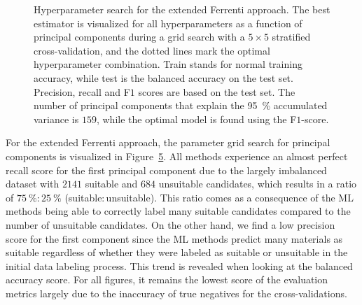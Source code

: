 \documentclass[superscriptaddress,unsortedaddress,
 amsmath,amssymb,
 aps,
]{revtex4-2}
\begin{document}
\begin{figure}[ht!]
  \begin{subfigure}[b]{1.0\textwidth}
    \centering
    
  \end{subfigure}
\par\bigskip
  \begin{subfigure}[b]{0.5\textwidth}
    
    \caption{}
    \label{fig:q2-LOG}
  \end{subfigure}%
  \hfill
  \begin{subfigure}[b]{0.5\textwidth}
    
    \caption{}
    \label{fig:q2-DT}
  \end{subfigure}

  \begin{subfigure}[b]{0.5\textwidth}
    
    \caption{}
    \label{fig:q2-RF}
  \end{subfigure}%
  \hfill
  \begin{subfigure}[b]{0.5\textwidth}
    
    \caption{}
    \label{fig:q2-GB}
  \end{subfigure}
  \caption{Hyperparameter search for the extended Ferrenti approach. The best estimator is visualized for all hyperparameters as a function of principal components during a grid search with a $5\times5$ stratified cross-validation, and the dotted lines mark the optimal hyperparameter combination. Train stands for normal training accuracy, while test is the balanced accuracy on the test set. Precision, recall and F$1$ scores  are based on the test set. The number of principal components that explain the \SI{95}{\percent} accumulated variance is $159$, while the optimal model is found using the F$1$-score.}
  \label{fig:02-pca}
\end{figure}

For the extended Ferrenti approach, the parameter grid search for principal components is visualized in Figure~\ref{fig:02-pca}. All methods experience an almost perfect recall score for the first principal component due to the largely imbalanced dataset with $2141$ suitable and $684$ unsuitable candidates, which results in  a ratio of $\SI{75}{\percent} : \SI{25}{\percent}$ (suitable$:$unsuitable). This ratio comes as a consequence of the ML methods being able to correctly label many suitable candidates compared to the number of unsuitable candidates. 
On the other hand, we find a low precision score for the first component since the ML methods  predict many materials as suitable regardless of whether they were labeled as suitable or unsuitable in the initial data labeling process. 
This trend is revealed when looking at the balanced accuracy score. For all figures, it remains the lowest score of the evaluation metrics largely due to the inaccuracy of true negatives for the cross-validations.  
\end{document}
